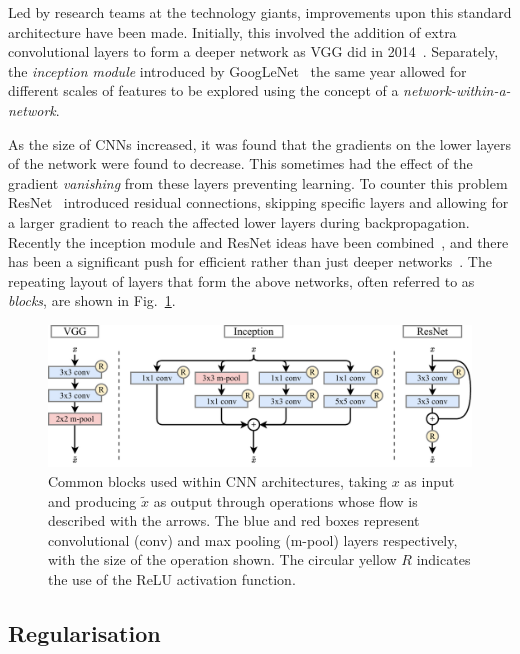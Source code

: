 Led by research teams at the technology giants, improvements upon this standard architecture have
been made. Initially, this involved the addition of extra convolutional layers to form a deeper
network as VGG did in 2014~\cite{simonyan2014}. Separately, the \emph{inception module} introduced
by GoogLeNet~\cite{szegedy2015} the same year allowed for different scales of features to be
explored using the concept of a \emph{network-within-a-network}.

As the size of CNNs increased, it was found that the gradients on the lower layers of the network
were found to decrease. This sometimes had the effect of the gradient \emph{vanishing} from these
layers preventing learning. To counter this problem ResNet~\cite{he2016_original, he2016_improved}
introduced residual connections, skipping specific layers and allowing for a larger gradient to
reach the affected lower layers during backpropagation. Recently the inception module and ResNet
ideas have been combined~\cite{szegedy2016}, and there has been a significant push for efficient
rather than just deeper networks~\cite{sandler2018,tan2019}. The repeating layout of layers that
form the above networks, often referred to as \emph{blocks}, are shown in Fig.~\ref{fig:blocks}.

\begin{figure} %
    \includegraphics[width=\textwidth]{diagrams/6-cvn/blocks.pdf}
    \caption[Common CNN architecture blocks]
    {Common blocks used within CNN architectures, taking $x$ as input and producing $\tilde{x}$ as
        output through operations whose flow is described with the arrows. The blue and red boxes
        represent convolutional (conv) and max pooling (m-pool) layers respectively, with the size
        of the operation shown. The circular yellow $R$ indicates the use of the ReLU activation
        function.}
    \label{fig:blocks}
\end{figure}

\subsection{Regularisation} %
\label{sec:cvn_theory_reg} %

